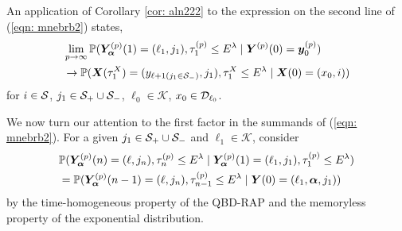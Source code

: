 An application of Corollary \ref{cor: aln222} to the expression on the second line of (\ref{eqn: mnebrb2}) states, 
\begin{align}
	&\lim_{p\to\infty}\mathbb P(\bm{Y}_{\bm{\alpha}}^{(p)}(1)=(\ell_1, j_1), \tau_{1}^{(p)}\leq E^\lambda
	 \mid \boldsymbol Y^{(p)}(0)=\boldsymbol y_0^{(p)}) \nonumber
	\\&\to \mathbb P(\boldsymbol X(\tau_1^X) = (y_{\ell+1(j_1\in\mathcal{S}_-)}, j_1), \tau_{1}^X\leq E^\lambda 
	\mid \boldsymbol X(0) = (x_0, i)) 
\end{align}
for \(i\in\mathcal{S}\), \(j_1\in\mathcal{S}_+\cup\mathcal{S}_-\), \(\ell_0\in\mathcal K\), \(x_0\in\mathcal{D}_{\ell_0}\).

We now turn our attention to the first factor in the summands of (\ref{eqn: mnebrb2}). For a given \(j_1\in\mathcal{S}_+\cup\mathcal{S}_-\) and \(\ell_1\in\mathcal K\),  consider
\begin{align}
	&\mathbb P(\bm{Y}_{\bm{\alpha}}^{(p)}(n) = (\ell, j_n), \tau_{n}^{(p)}\leq E^\lambda 
	 \mid \bm{Y}_{\bm{\alpha}}^{(p)}(1)=(\ell_1, j_1), \tau_1^{(p)}\leq E^\lambda) \nonumber 
	\\&=\mathbb P(\bm{Y}_{\bm{\alpha}}^{(p)}(n-1) = (\ell, j_n), \tau_{n-1}^{(p)}\leq E^\lambda 
	 \mid \boldsymbol Y(0)=(\ell_1,\boldsymbol \alpha, j_1))\label{eqn: dskvnaSF}
\end{align}
by the time-homogeneous property of the QBD-RAP and the memoryless property of the exponential distribution.


